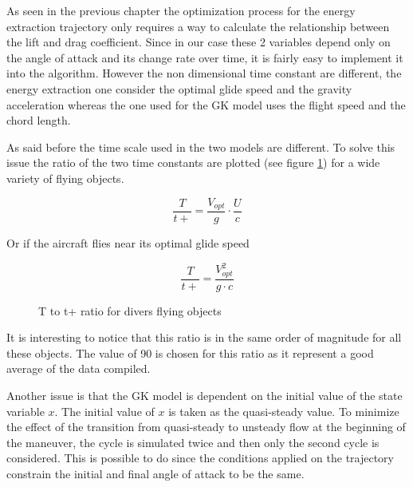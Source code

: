 
\par As seen in the previous chapter the optimization process for the energy extraction trajectory only requires a way to calculate the relationship between the lift and drag coefficient.
Since in our case these 2 variables depend only on the angle of attack and its change rate over time, it is fairly easy to implement it into the algorithm.
However the non dimensional time constant are different, the energy extraction one consider the optimal glide speed and the gravity acceleration whereas the one used for the GK model uses the flight speed and the chord length.


As said before the time scale used in the two models are different.
To solve this issue the ratio of the two time constants are plotted (see figure \ref{fig:T_t+_ratio}) for a wide variety of flying objects.

\begin{equation}
  \frac{T}{t+}=\frac{V_{opt}}{g} \cdot \frac{U}{c}
  \label{eqn:T_t+}
\end{equation}

Or if the aircraft flies near its optimal glide speed

\begin{equation}
  \frac{T}{t+}=\frac{V_{opt}^2}{g \cdot c}
  \label{eqn:T_t+_ratio}
\end{equation}

\begin{figure}[ht]
  \begin{center}
  \end{center}
  \caption{T to t+ ratio for divers flying objects}
  \label{fig:T_t+_ratio}
\end{figure}

\par It is interesting to notice that this ratio is in the same order of magnitude for all these objects.
The value of 90 is chosen for this ratio as it represent a good average of the data compiled.

\par Another issue is that the GK model is dependent on the initial value of the state variable $x$.
The initial value of $x$ is taken as the quasi-steady value.
To minimize the effect of the transition from quasi-steady to unsteady flow at the beginning of the maneuver, the cycle is simulated twice and then only the second cycle is considered.
This is possible to do since the conditions applied on the trajectory constrain the initial and final angle of attack to be the same.
